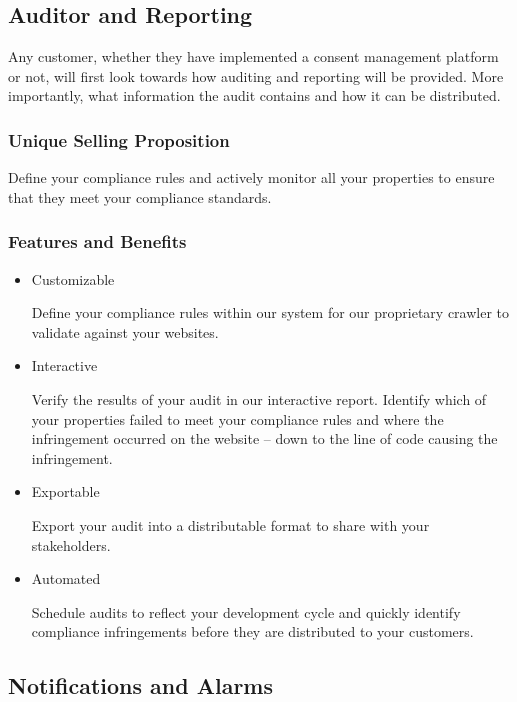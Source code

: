 \subsection{Auditor and Reporting}

Any customer, whether they have implemented a consent management platform or not, will first look towards how auditing and reporting will be provided. More importantly, what information the audit contains and how it can be distributed.

\subsubsection*{Unique Selling Proposition}

Define your compliance rules and actively monitor all your properties to ensure that they meet your compliance standards.

\subsubsection*{Features and Benefits}

\begin{itemize}

\item Customizable

  Define your compliance rules within our system for our proprietary crawler to validate against your websites.

\item Interactive

  Verify the results of your audit in our interactive report. Identify which of your properties failed to meet your compliance rules and where the infringement occurred on the website -- down to the line of code causing the infringement.

\item Exportable

  Export your audit into a distributable format to share with your stakeholders.

\item Automated

  Schedule audits to reflect your development cycle and quickly identify compliance infringements before they are distributed to your customers.

\end{itemize}


\subsection{Notifications and Alarms}

